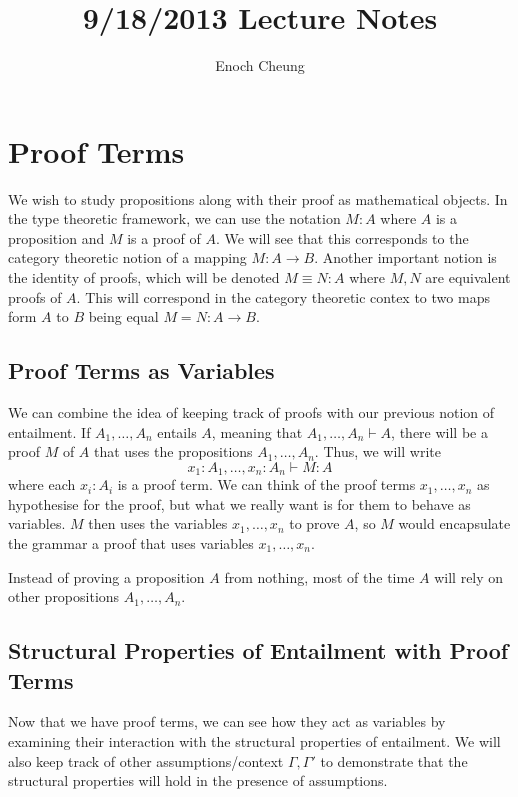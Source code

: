 \documentclass[12pt]{article}
\begin{document}
\title{9/18/2013 Lecture Notes}
\author{Enoch Cheung}
\date{}

\maketitle

\section{Proof Terms}

We wish to study propositions along with their proof as mathematical objects. In the type theoretic framework, we can use the notation $M:A$ where $A$ is a proposition and $M$ is a proof of $A$. We will see that this corresponds to the category theoretic notion of a mapping $M:A\to B$. Another important notion is  the identity of proofs, which will be denoted $M\equiv N:A$ where $M,N$ are equivalent proofs of $A$. This will correspond in the category theoretic contex to two maps form $A$ to $B$ being equal $M=N:A\to B$.

\subsection{Proof Terms as Variables}

We can combine the idea of keeping track of proofs with our previous notion of entailment. If $A_1,\dots,A_n$ entails $A$, meaning that $A_1,\dots, A_n\vdash A$, there will be a proof $M$ of $A$ that uses the propositions $A_1,\dots,A_n$. Thus, we will write
\[
x_1:A_1,\dots, x_n:A_n \vdash M:A
\] 
where each $x_i:A_i$ is a proof term. We can think of the proof terms $x_1,\dots,x_n$ as hypothesise for the proof, but what we really want is for them to behave as variables. $M$ then uses the variables $x_1,\dots,x_n$ to prove $A$, so $M$ would encapsulate the grammar a proof that uses variables $x_1,\dots,x_n$.




Instead of proving a proposition $A$ from nothing, most of the time $A$ will rely on other propositions $A_1,\dots, A_n$.

\subsection{Structural Properties of Entailment with Proof Terms}

Now that we have proof terms, we can see how they act as variables by examining their interaction with the structural properties of entailment. We will also keep track of other assumptions/context $\Gamma,\Gamma'$ to demonstrate that the structural properties will hold in the presence of assumptions.
\end{document}
